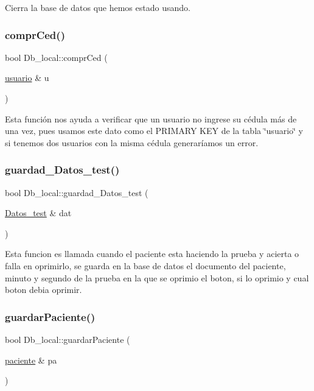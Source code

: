 Cierra la base de datos que hemos estado usando. \mbox{\label{class_db__local_a7ae3a56bdf45122af6dc7e15f01cc7c9}} 
\subsubsection{\texorpdfstring{compr\+Ced()}{comprCed()}}
{\footnotesize\ttfamily bool Db\+\_\+local\+::compr\+Ced (\begin{DoxyParamCaption}\item[{\hyperlink{classusuario}{usuario} \&}]{u }\end{DoxyParamCaption})}

Esta función nos ayuda a verificar que un usuario no ingrese su cédula más de una vez, pues usamos este dato como el P\+R\+I\+M\+A\+RY K\+EY de la tabla \char`\"{}usuario\char`\"{} y si tenemos dos usuarios con la misma cédula generaríamos un error. \mbox{\label{class_db__local_a198c494ca161235dae8e6fb5a1219034}} 
\subsubsection{\texorpdfstring{guardad\+\_\+\+Datos\+\_\+test()}{guardad\_Datos\_test()}}
{\footnotesize\ttfamily bool Db\+\_\+local\+::guardad\+\_\+\+Datos\+\_\+test (\begin{DoxyParamCaption}\item[{\hyperlink{class_datos__test}{Datos\+\_\+test} \&}]{dat }\end{DoxyParamCaption})}

Esta funcion es llamada cuando el paciente esta haciendo la prueba y acierta o falla en oprimirlo, se guarda en la base de datos el documento del paciente, minuto y segundo de la prueba en la que se oprimio el boton, si lo oprimio y cual boton debia oprimir. \mbox{\label{class_db__local_a21d574f5ecec89adf7f2fc8735862eca}} 
\subsubsection{\texorpdfstring{guardar\+Paciente()}{guardarPaciente()}}
{\footnotesize\ttfamily bool Db\+\_\+local\+::guardar\+Paciente (\begin{DoxyParamCaption}\item[{\hyperlink{classpaciente}{paciente} \&}]{pa }\end{DoxyParamCaption})}

